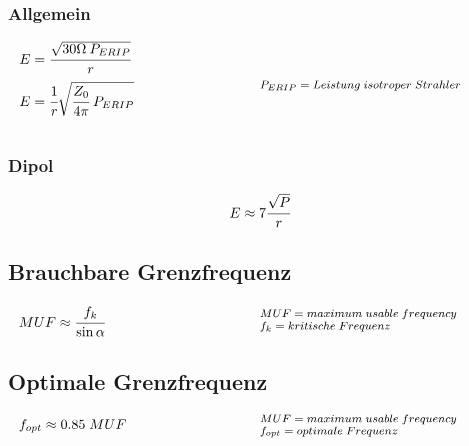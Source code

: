 \documentclass[12pt,a5paper,ngerman,titlepage]{article}
\begin{document}
\subsubsection{Allgemein}
\[
\begin{minipage}{.5\linewidth}
	
  $E=\cfrac{\sqrt{30 \Omega \: P_{ERIP}}}{r}$\\[5pt]
  $E=\cfrac{1}{r}\sqrt{\cfrac{Z_{0}}{4 \pi} \; P_{ERIP}}$\\[5pt]

\end{minipage}%
\begin{minipage}{.5\linewidth}
  \fontsize{8pt}{9pt}\selectfont
  $P_{ERIP} = Leistung \; isotroper \; Strahler$
\end{minipage}
\]

\subsubsection{Dipol}
$$E \approx 7\cfrac{\sqrt{P}}{r}$$

\subsection{Brauchbare Grenzfrequenz}
\[
\begin{minipage}{.5\linewidth}
	
  $MUF \approx \cfrac{f_{k}}{\sin \alpha}$ 

\end{minipage}%
\begin{minipage}{.5\linewidth}
  \fontsize{8pt}{9pt}\selectfont
  $MUF = maximum \; usable \; frequency$ \\
  $f_{k} = kritische \; Frequenz$
\end{minipage}
\]

\subsection{Optimale Grenzfrequenz}
\[
\begin{minipage}{.5\linewidth}
	
  $f_{opt} \approx 0.85 \; MUF$ 

\end{minipage}%
\begin{minipage}{.5\linewidth}
  \fontsize{8pt}{9pt}\selectfont
  $MUF = maximum \; usable \; frequency$ \\
  $f_{opt} = optimale \; Frequenz$
\end{minipage}
\]
\end{document}
